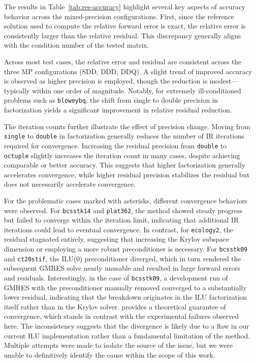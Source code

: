 The results in Table~\ref{tab:res-accuracy} highlight several key aspects of
accuracy behavior across the mixed-precision configurations. First, since the
reference solution used to compute the relative forward error is exact, the
relative error is consistently larger than the relative residual. This
discrepancy generally aligns with the condition number of the tested matrix.

Across most test cases, the relative error and residual are consistent across
the three MP configurations (SDD, DDD, DDQ). A slight trend of improved accuracy
is observed as higher precision is employed, though the reduction is
modest---typically within one order of magnitude. Notably, for extremely
ill-conditioned problems such as \texttt{bloweybq}, the shift from single to
double precision in factorization yields a significant improvement in relative
residual reduction.

The iteration counts further illustrate the effect of precision change. Moving
from \texttt{single} to \texttt{double} in factorization generally reduces the
number of IR iterations required for convergence. Increasing the residual
precision from \texttt{double} to \texttt{octuple} slightly increases the
iteration count in many cases, despite achieving comparable or better accuracy.
This suggests that higher factorization generally accelerates convergence, while
higher residual precision stabilizes the residual but does not necessarily
accelerate convergence.

For the problematic cases marked with asterisks, different convergence behaviors
were observed. For \texttt{bcsstk14} and \texttt{plat362}, the method showed
steady progress but failed to converge within the iteration limit, indicating
that additional IR iterations could lead to eventual convergence. In contrast,
for \texttt{ecology2}, the residual stagnated entirely, suggesting that
increasing the Krylov subspace dimension or employing a more robust
preconditioner is necessary. For \texttt{bcsstk09} and \texttt{ct20stif}, the
ILU(0) preconditioner diverged, which in turn rendered the subsequent GMRES
solve nearly unusable and resulted in large forward errors and residuals.
Interestingly, in the case of \texttt{bcsstk09}, a development run of GMRES with
the preconditioner manually removed converged to a substantially lower residual,
indicating that the breakdown originates in the ILU factorization itself rather
than in the Krylov solver. \textcite{chow_fine-grained_2015} provides a
theoretical guarantee of convergence, which stands in contrast with the
experimental failures observed here. The inconsistency suggests that the
divergence is likely due to a flaw in our current ILU implementation rather than
a fundamental limitation of the method. Multiple attempts were made to isolate
the source of the issue, but we were unable to definitively identify the cause
within the scope of this work.

